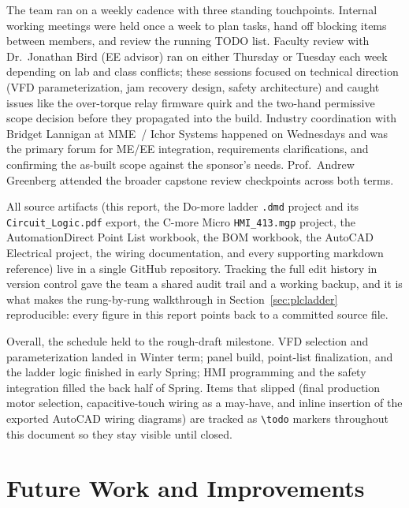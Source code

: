 \documentclass[hidelinks,12pt]{article}
\begin{document}
The team ran on a weekly cadence with three standing touchpoints. Internal
working meetings were held once a week to plan tasks, hand off blocking items
between members, and review the running TODO list. Faculty review with
Dr.~Jonathan Bird (EE advisor) ran on either Thursday or Tuesday each week
depending on lab and class conflicts; these sessions focused on technical
direction (VFD parameterization, jam recovery design, safety architecture) and
caught issues like the over-torque relay firmware quirk and the two-hand
permissive scope decision before they propagated into the build. Industry
coordination with Bridget Lannigan at MME~/ Ichor Systems happened on Wednesdays
and was the primary forum for ME/EE integration, requirements clarifications,
and confirming the as-built scope against the sponsor's needs. Prof.~Andrew
Greenberg attended the broader capstone review checkpoints across both terms.

All source artifacts (this report, the Do-more ladder \texttt{.dmd} project and
its \texttt{Circuit\_Logic.pdf} export, the C-more Micro \texttt{HMI\_413.mgp}
project, the AutomationDirect Point List workbook, the BOM workbook, the
AutoCAD Electrical project, the wiring documentation, and every supporting
markdown reference) live in a single GitHub repository. Tracking the full edit
history in version control gave the team a shared audit trail and a working
backup, and it is what makes the rung-by-rung walkthrough in
Section~\ref{sec:plcladder} reproducible: every figure in this report points
back to a committed source file.

Overall, the schedule held to the rough-draft milestone. VFD selection and
parameterization landed in Winter term; panel build, point-list finalization,
and the ladder logic finished in early Spring; HMI programming and the safety
integration filled the back half of Spring. Items that slipped (final
production motor selection, capacitive-touch wiring as a may-have, and
inline insertion of the exported AutoCAD wiring diagrams) are tracked as
\texttt{\textbackslash todo} markers throughout this document so they stay
visible until closed.

\section{Future Work and Improvements}
\end{document}
